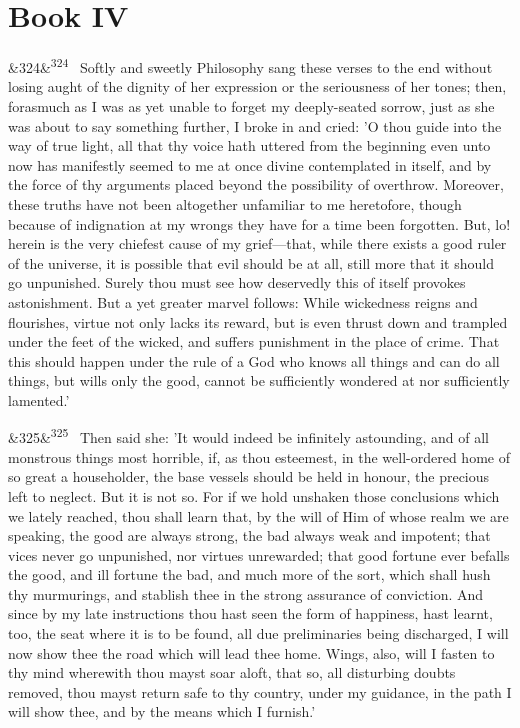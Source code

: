 \documentclass[12pt]{article}
\newcommand{\para}[1][]{\par\noindent\ifx&#1&\else\textsuperscript{\footnotesize #1}~\fi}
\begin{document}
\section*{Book IV}

\para[324] Softly and sweetly Philosophy sang these verses to the end without losing aught of the dignity of her expression or the seriousness of her tones; then, forasmuch as I was as yet unable to forget my deeply-seated sorrow, just as she was about to say something further, I broke in and cried: 'O thou guide into the way of true light, all that thy voice hath uttered from the beginning even unto now has manifestly seemed to me at once divine contemplated in itself, and by the force of thy arguments placed beyond the possibility of overthrow. Moreover, these truths have not been altogether unfamiliar to me heretofore, though because of indignation at my wrongs they have for a time been forgotten. But, lo! herein is the very chiefest cause of my grief---that, while there exists a good ruler of the universe, it is possible that evil should be at all, still more that it should go unpunished. Surely thou must see how deservedly this of itself provokes astonishment. But a yet greater marvel follows: While wickedness reigns and flourishes, virtue not only lacks its reward, but is even thrust down and trampled under the feet of the wicked, and suffers punishment in the place of crime. That this should happen under the rule of a God who knows all things and can do all things, but wills only the good, cannot be sufficiently wondered at nor sufficiently lamented.'

\para[325] Then said she: 'It would indeed be infinitely astounding, and of all monstrous things most horrible, if, as thou esteemest, in the well-ordered home of so great a householder, the base vessels should be held in honour, the precious left to neglect. But it is not so. For if we hold unshaken those conclusions which we lately reached, thou shall learn that, by the will of Him of whose realm we are speaking, the good are always strong, the bad always weak and impotent; that vices never go unpunished, nor virtues unrewarded; that good fortune ever befalls the good, and ill fortune the bad, and much more of the sort, which shall hush thy murmurings, and stablish thee in the strong assurance of conviction. And since by my late instructions thou hast seen the form of happiness, hast learnt, too, the seat where it is to be found, all due preliminaries being discharged, I will now show thee the road which will lead thee home. Wings, also, will I fasten to thy mind wherewith thou mayst soar aloft, that so, all disturbing doubts removed, thou mayst return safe to thy country, under my guidance, in the path I will show thee, and by the means which I furnish.'
\end{document}

